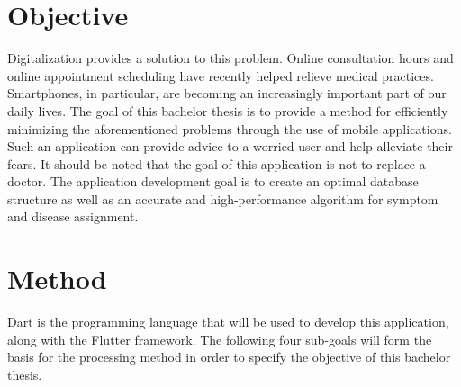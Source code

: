 \section{Objective}
Digitalization provides a solution to this problem. Online consultation hours and online appointment scheduling have recently helped relieve medical practices.
Smartphones, in particular, are becoming an increasingly important part of our daily lives. The goal of this bachelor thesis is to provide a method for efficiently minimizing the aforementioned problems through the use of mobile applications. Such an application can provide advice to a worried user and help alleviate their fears. It should be noted that the goal of this application is not to replace a doctor.
The application development goal is to create an optimal database structure as well as an accurate and high-performance algorithm for symptom and disease assignment.

\section{Method}
Dart is the programming language that will be used to develop this application, along with the Flutter framework. The following four sub-goals will form the basis for the processing method in order to specify the objective of this bachelor thesis.

